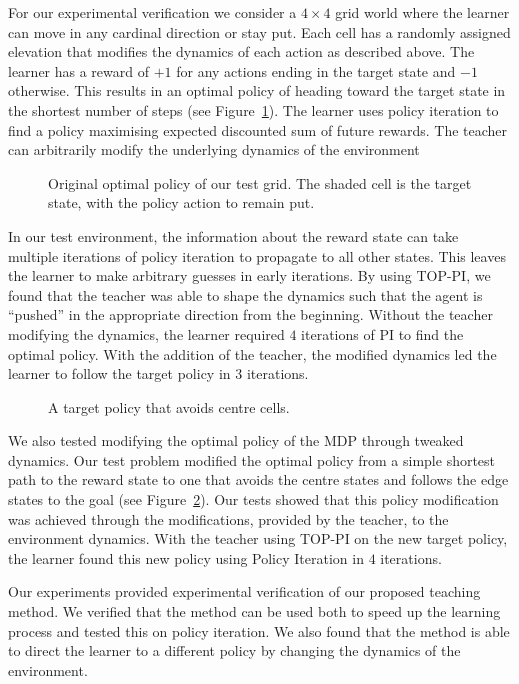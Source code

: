 For our experimental verification we consider a $4 \times 4$ grid world where the learner can move in any cardinal direction or stay put.  Each cell has a randomly assigned elevation that modifies the dynamics of each action as described above.  The learner has a reward of $+1$ for any actions ending in the target state and $-1$ otherwise.  This results in an optimal policy of heading toward the target state in the shortest number of steps (see Figure~\ref{prevopt}).  The learner uses policy iteration to find a policy maximising expected discounted sum of future rewards.  The teacher can arbitrarily modify the underlying dynamics of the environment

\begin{figure}[ht]
\centerline{}
\caption{\label{prevopt}Original optimal policy of our test grid.  The shaded cell is the target state, with the policy action to remain put.}
\end{figure}

In our test environment, the information about the reward state can take multiple iterations of policy iteration to propagate to all other states.  This leaves the learner to make arbitrary guesses in early iterations.  By using TOP-PI, we found that the teacher was able to shape the dynamics such that the agent is ``pushed'' in the appropriate direction from the beginning.  Without the teacher modifying the dynamics, the learner required $4$ iterations of PI to find the optimal policy.  With the addition of the teacher, the modified dynamics led the learner to follow the target policy in $3$ iterations.

\begin{figure}[ht]
\centerline{}
\caption{\label{newopt}A target policy that avoids centre cells.}
\end{figure}

We also tested modifying the optimal policy of the MDP through tweaked dynamics.  Our test problem modified the optimal policy from a simple shortest path to the reward state to one that avoids the centre states and follows the edge states to the goal (see Figure~\ref{newopt}).  Our tests showed that this policy modification was achieved through the modifications, provided by the teacher, to the environment dynamics.   With the teacher using TOP-PI on the new target policy, the learner found this new policy using Policy Iteration in $4$ iterations.

Our experiments provided experimental verification of our proposed teaching method.  We verified that the method can be used both to speed up the learning process and tested this on policy iteration.  We also found that the method is able to direct the learner to a different policy by changing the dynamics of the environment.
